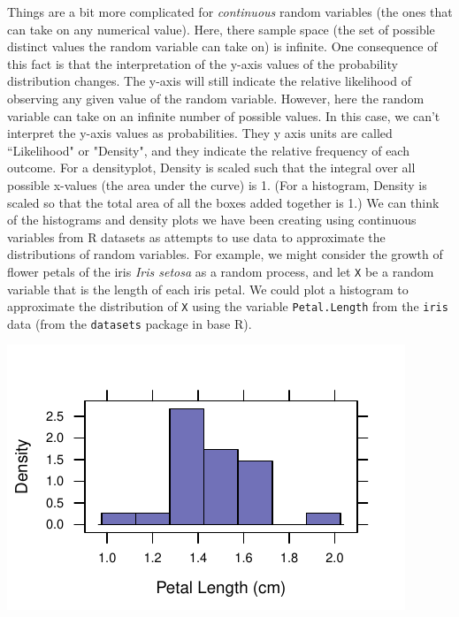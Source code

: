 \documentclass[twoside]{book}\usepackage[]{graphicx}\usepackage[]{xcolor}
\makeatletter
\def\maxwidth{ %
  \ifdim\Gin@nat@width>\linewidth
    \linewidth
  \else
    \Gin@nat@width
  \fi
}
\newenvironment{knitrout}{}{} %
\newcommand{\Rindex}[1]{\index{\texttt{#1}}}
\newcommand{\dataframe}[1]{{\color{blue!80!black}\texttt{#1}}\Rindex{#1}}
\newcommand{\pkg}[1]{{\color{red!80!black}\texttt{#1}}\Rindex{#1}}
\newcounter{example}[section]
\makeatother
\begin{document}
Things are a bit more complicated for \emph{continuous} random variables (the ones that can take on any numerical value).  Here, there sample space (the set of possible distinct values the random variable can take on) is infinite.  One consequence of this fact is that the interpretation of the y-axis values of the probability distribution changes.  The y-axis will still indicate the relative likelihood of observing any given value of the random variable.  However, here the random variable can take on an infinite number of possible values.  In this case, we can't interpret the y-axis values as probabilities.  They y axis units are called ``Likelihood" or "Density", and they indicate the relative frequency of each outcome. For a densityplot, Density is scaled such that the integral over all possible x-values (the area under the curve) is 1. (For a histogram, Density is scaled so that the total area of all the boxes added together is 1.)  We can think of the histograms and density plots we have been creating using continuous variables from R datasets as attempts to use data to approximate the distributions of random variables.  For example, we might consider the growth of flower petals of the iris \textit{Iris setosa} as a random process, and let \texttt{X} be a random variable that is the length of each iris petal.  We could plot a histogram to approximate the distribution of \texttt{X} using the variable \texttt{Petal.Length} from the \dataframe{iris} data (from the \pkg{datasets} package in base R).

\begin{knitrout}
\color{fgcolor}

{\centering \includegraphics[width=\maxwidth]{figures/fig-cont_pdf-1} 

}



\end{knitrout}
\end{document}
